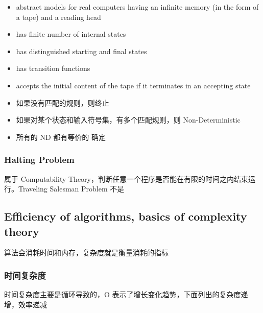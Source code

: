 \documentclass[11pt,journal,compsoc]{IEEEtran}
\begin{document}
\begin{itemize}
    \item abstract models for real computers having an infinite memory (in the form of a tape) and a reading head

    \item has finite number of internal states

    \item has distinguished starting and final states

    \item has transition functions
\end{itemize}

\begin{itemize}
    \item accepts the initial content of the tape if it terminates in an accepting state

    \item 如果没有匹配的规则，则终止

    \item 如果对某个状态和输入符号集，有多个匹配规则，则 Non-Deterministic

    \item 所有的 ND 都有等价的 确定
\end{itemize}


\subsubsection{Halting Problem}

属于 Computability Theory，判断任意一个程序是否能在有限的时间之内结束运行。Traveling Salesman Problem 不是


\subsection{Efficiency of algorithms, basics of complexity theory}

算法会消耗时间和内存，复杂度就是衡量消耗的指标


\subsubsection{时间复杂度}

时间复杂度主要是循环导致的，O 表示了增长变化趋势，下面列出的复杂度递增，效率递减
\end{document}
